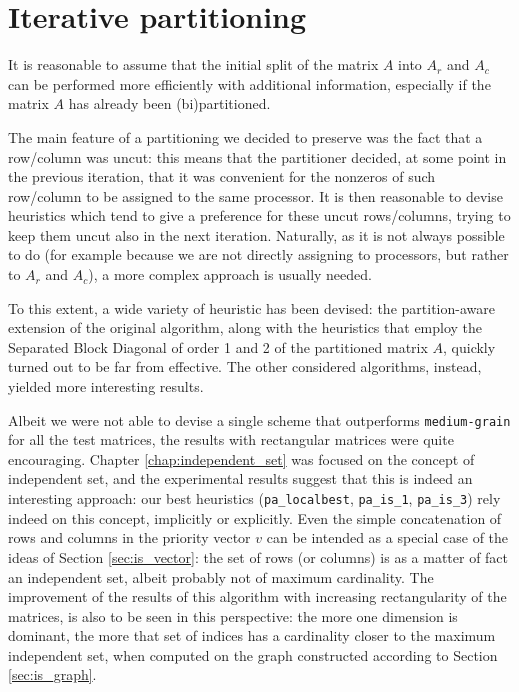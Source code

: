 \section{Iterative partitioning} \label{sec:conclusions_pa}

It is reasonable to assume that the initial split of the matrix $A$ into $A_r$ and $A_c$ can be performed more efficiently with additional information, especially if the matrix $A$ has already been (bi)partitioned.

The main feature of a partitioning we decided to preserve was the fact that a row/column was uncut: this means that the partitioner decided, at some point in the previous iteration, that it was convenient for the nonzeros of such row/column to be assigned to the same processor. It is then reasonable to devise heuristics which tend to give a preference for these uncut rows/columns, trying to keep them uncut also in the next iteration. Naturally, as it is not always possible to do (for example because we are not directly assigning to processors, but rather to $A_r$ and $A_c$), a more complex approach is usually needed.

To this extent, a wide variety of heuristic has been devised: the partition-aware extension of the original algorithm, along with the heuristics that employ the Separated Block Diagonal of order 1 and 2 of the partitioned matrix $A$, quickly turned out to be far from effective. The other considered algorithms, instead, yielded more interesting results.

Albeit we were not able to devise a single scheme that outperforms \verb|medium-grain| for all the test matrices, the results with rectangular matrices were quite encouraging. Chapter \ref{chap:independent_set} was focused on the concept of independent set, and the experimental results suggest that this is indeed an interesting approach: our best heuristics (\verb|pa_localbest|, \verb|pa_is_1|, \verb|pa_is_3|) rely indeed on this concept, implicitly or explicitly. Even the simple concatenation of rows and columns in the priority vector $v$ can be intended as a special case of the ideas of Section \ref{sec:is_vector}: the set of rows (or columns) is as a matter of fact an independent set, albeit probably not of maximum cardinality. The improvement of the results of this algorithm with increasing rectangularity of the matrices, is also to be seen in this perspective: the more one dimension is dominant, the more that set of indices has a cardinality closer to the maximum independent set, when computed on the graph constructed according to Section \ref{sec:is_graph}.

